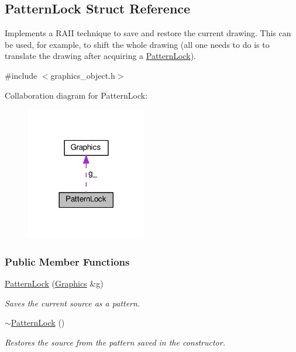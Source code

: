 \hypertarget{structPatternLock}{}\subsection{Pattern\+Lock Struct Reference}
\label{structPatternLock}


Implements a R\+A\+II technique to save and restore the current drawing. This can be used, for example, to shift the whole drawing (all one needs to do is to translate the drawing after acquiring a \hyperlink{structPatternLock}{Pattern\+Lock}).  




{\ttfamily \#include $<$graphics\+\_\+object.\+h$>$}



Collaboration diagram for Pattern\+Lock\+:\nopagebreak
\begin{figure}[H]
\begin{center}
\leavevmode
\includegraphics[width=149pt]{structPatternLock__coll__graph}
\end{center}
\end{figure}
\subsubsection*{Public Member Functions}
\begin{DoxyCompactItemize}
\item 
\hyperlink{structPatternLock_ac48b35a4338b39983872c43255cb2623}{Pattern\+Lock} (\hyperlink{structGraphics}{Graphics} \&g)\hypertarget{structPatternLock_ac48b35a4338b39983872c43255cb2623}{}\label{structPatternLock_ac48b35a4338b39983872c43255cb2623}

\begin{DoxyCompactList}\small\item\em Saves the current source as a pattern. \end{DoxyCompactList}\item 
\hyperlink{structPatternLock_aa209152c8442d89c1f53e90ae886c161}{$\sim$\+Pattern\+Lock} ()\hypertarget{structPatternLock_aa209152c8442d89c1f53e90ae886c161}{}\label{structPatternLock_aa209152c8442d89c1f53e90ae886c161}

\begin{DoxyCompactList}\small\item\em Restores the source from the pattern saved in the constructor. \end{DoxyCompactList}\end{DoxyCompactItemize}
